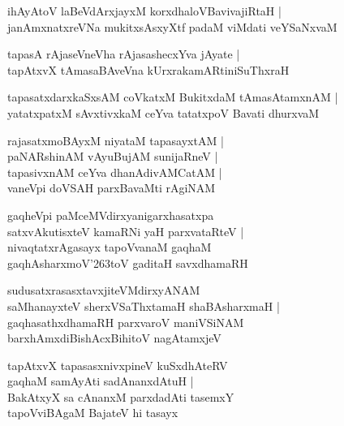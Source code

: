 \documentclass[twoside,12pt,openright]{book}
\def\S{\char'263}
\newcounter{shloka}[chapter]
\begin{document}
\begin{shloka}%
ihAyAtoV laBeVdArxjayxM korxdhaloVBavivajiRtaH |\\
janAmxnatxreVNa mukitxsAsxyXtf padaM viMdati veYSaNxvaM 
\end{shloka}

\begin{shloka}%
tapasA rAjaseVneVha rAjasashecxYva jAyate |\\
tapAtxvX tAmasaBAveVna kUrxrakamARtiniSuThxraH
\end{shloka}

\begin{shloka}%
tapasatxdarxkaSxsAM coVkatxM BukitxdaM tAmasAtamxnAM |\\
yatatxpatxM sAvxtivxkaM ceYva tatatxpoV Bavati dhurxvaM 
\end{shloka}

\begin{shloka}%
rajasatxmoBAyxM niyataM tapasayxtAM |\\
paNARshinAM vAyuBujAM sunijaRneV |\\
tapasivxnAM ceYva dhanAdivAMCatAM |\\
vaneVpi doVSAH parxBavaMti rAgiNAM 
\end{shloka}

\begin{shloka}%
gaqheVpi paMceMVdirxyanigarxhasatxpa \\
satxvAkutisxteV kamaRNi yaH parxvataRteV |\\
nivaqtatxrAgasayx tapoVvanaM gaqhaM \\
gaqhAsharxmoV\S toV gaditaH savxdhamaRH 
\end{shloka}

\begin{shloka}%
sudusatxrasasxtavxjiteVMdirxyANAM \\
saMhanayxteV sherxVSaThxtamaH shaBAsharxmaH |\\
gaqhasathxdhamaRH parxvaroV maniVSiNAM \\
barxhAmxdiBishAcxBihitoV nagAtamxjeV
\end{shloka}

\begin{shloka}%
tapAtxvX tapasasxnivxpineV kuSxdhAteRV \\
gaqhaM samAyAti sadAnanxdAtuH |\\
BakAtxyX sa cAnanxM parxdadAti tasemxY \\
tapoVviBAgaM BajateV hi tasayx 
\end{shloka}
\end{document}
